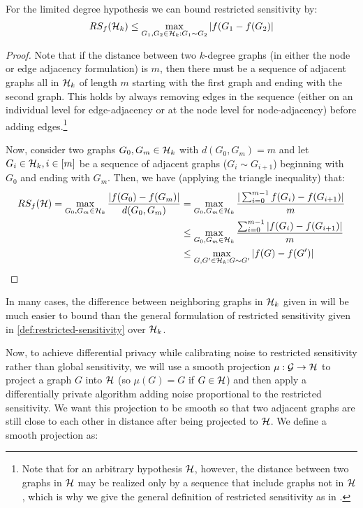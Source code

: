 \begin{lemma}
	\label{lemma:RS-Hk}
	For the limited degree hypothesis we can bound restricted sensitivity by: 
$$RS_f(\mathcal{H}_k)  \leq \max_{G_1, G_2 \in \mathcal{H}_k: G_1 \sim G_2} |f(G_1 - f(G_2)|$$
\end{lemma}
\begin{proof}
	Note that if the distance between two $k$-degree graphs (in either the node or edge adjacency formulation) is $m$, then there must be a sequence of adjacent graphs all in $\mathcal{H}_k$ of length $m$ starting with the first graph and ending with the second graph. This holds by always removing edges in the sequence (either on an individual level for edge-adjacency or at the node level for node-adjacency) before adding edges.\footnote{Note that for an arbitrary hypothesis $\mathcal{H}$, however, the distance between two graphs in $\mathcal{H}$ may be realized only by a sequence that include graphs not in $\mathcal{H}$, which is why we give the general definition of restricted sensitivity as in .} 
	
	Now, consider two graphs $G_0, G_m \in \mathcal{H}_k$ with $d(G_0, G_m) = m$ and let $G_i \in \mathcal{H}_k, i \in [m]$ be a sequence of adjacent graphs ($G_i \sim G_{i+1}$) beginning with $G_0$ and ending with $G_m$. Then, we have (applying the triangle inequality) that:
	\begin{align*}
	RS_f(\mathcal{H}) = \max_{G_0, G_m \in \mathcal{H}_k} \frac{|f(G_0) - f(G_m)|}{d(G_0, G_m)} & = \max_{G_0, G_m \in \mathcal{H}_k} \frac{| \sum_{i = 0}^{m-1}f(G_i) - f(G_{i+1})|}{m} \\
	& \leq \max_{G_0, G_m \in \mathcal{H}_k}  \frac{\sum_{i = 0}^{m-1}|f(G_i) - f(G_{i+1})|}{m} \\
	& \leq \max_{G, G' \in \mathcal{H}_k: G \sim G'} |f(G) - f(G')|
	\end{align*}
\end{proof}

In many cases, the difference between neighboring graphs in $\mathcal{H}_k$ given in  will be much easier to bound than the general formulation of restricted sensitivity given in \cref{def:restricted-sensitivity} over $\mathcal{H}_k$.

Now, to achieve differential privacy while calibrating noise to restricted sensitivity rather than global sensitivity, we will use a smooth projection $\mu: \mathcal{G} \to \mathcal{H}$ to project a graph $G$ into $\mathcal{H}$ (so $\mu(G) = G$ if $G \in \mathcal{H}$) and then apply a differentially private algorithm adding noise proportional to the restricted sensitivity. We want this projection to be smooth so that two adjacent graphs are still close to each other in distance after being projected to $\mathcal{H}$. We define a smooth projection as:

